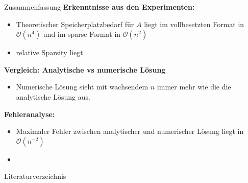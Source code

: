 \documentclass[9pt, t]{beamer}
\begin{document}
\begin{frame}{Zusammenfassung}
    \textbf{Erkenntnisse aus den Experimenten:}
    \begin{itemize}
        \item Theoretischer Speicherplatzbedarf für \(A\) liegt im vollbesetzten Format in
        \(\mathcal{O}(n^4)\) und im sparse Format in \(\mathcal{O}(n^2)\) 
        \item relative Sparsity liegt 
    \end{itemize}

    \textbf{Vergleich: Analytische vs numerische Lösung}
    \begin{itemize}
        \item Numerische Lösung sieht mit wachsendem \(n\) immer mehr wie die
        die analytische Lösung aus.
    \end{itemize}

    \textbf{Fehleranalyse:}
    \begin{itemize}
        \item Maximaler Fehler zwischen analytischer und numerischer Lösung liegt
        in \(\mathcal{O}(n^{-2})\)
        \item 
    \end{itemize}
\end{frame}



\begin{frame}{Literaturverzeichnis}
    \printbibliography
\end{frame}
\end{document}
